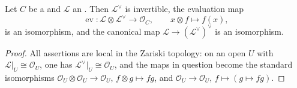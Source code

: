 \begin{lemma}
\label{lem:pcb-invertible-dual}
Let \(C\) be a  and \(\mathcal L\) an
.  Then
\(\mathcal L^{\vee}\) is invertible, the evaluation map
\[
 \operatorname{ev}:\mathcal L\otimes\mathcal L^{\vee}\to\mathcal O_C,
 \qquad x\otimes f\mapsto f(x),
\]
is an isomorphism, and the canonical map
\(\mathcal L\to(\mathcal L^{\vee})^{\vee}\) is an isomorphism.
\end{lemma}
\begin{proof}
All assertions are local in the Zariski topology: on an open \(U\)
with \(\mathcal L|_U\cong\mathcal O_U\), one has
\(\mathcal L^{\vee}|_U\cong\mathcal O_U\), and the maps in question
become the standard isomorphisms \(\mathcal O_U\otimes\mathcal O_U\to
\mathcal O_U\), \(f\otimes g\mapsto fg\), and
\(\mathcal O_U\to\mathcal O_U\), \(f\mapsto(g\mapsto fg)\).
\end{proof}

